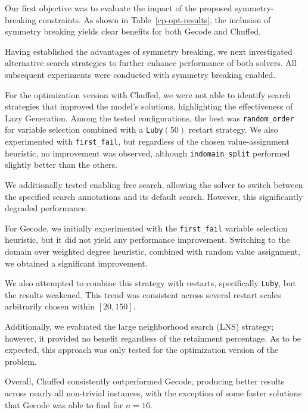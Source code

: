 Our first objective was to evaluate the impact of the proposed symmetry-breaking constraints. As shown in Table~\ref{cp-opt-results}, the inclusion of symmetry breaking yields clear benefits for both Gecode and Chuffed. 

Having established the advantages of symmetry breaking, we next investigated alternative search strategies to further enhance performance of both solvers. All subsequent experiments were conducted with symmetry breaking enabled.

For the optimization version with Chuffed, we were not able to identify search strategies that improved the model’s solutions, highlighting the effectiveness of Lazy   Generation. Among the tested configurations, the best was \texttt{random\_order} for variable selection combined with a \texttt{Luby$(50)$} restart strategy. We also experimented with \texttt{first\_fail}, but regardless of the chosen value-assignment heuristic, no improvement was observed, although \texttt{indomain\_split} performed slightly better than the others.

We additionally tested enabling free search, allowing the solver to switch between the specified search annotations and its default search. However, this significantly degraded performance.

For Gecode, we initially experimented with the \texttt{first\_fail} variable selection heuristic, but it did not yield any performance improvement. Switching to the domain over weighted degree heuristic, combined with random value assignment, we obtained a significant improvement.

We also attempted to combine this strategy with restarts, specifically \texttt{Luby}, but the results weakened. This trend was consistent across several restart scales arbitrarily chosen within $[20,150]$.

Additionally, we evaluated the large neighborhood search (LNS) strategy; however, it provided no benefit regardless of the retainment percentage. As to be expected, this approach was only tested for the optimization version of the problem.

Overall, Chuffed consistently outperformed Gecode, producing better results across nearly all non-trivial instances, with the exception of some faster solutions that Gecode was able to find for $n=16$. 

